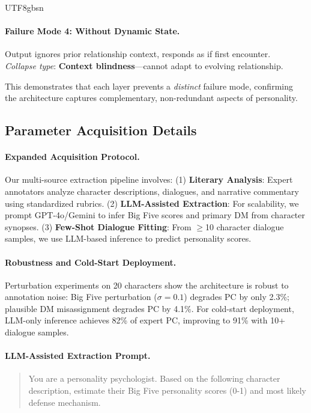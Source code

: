 \documentclass[11pt]{article}
\begin{document}
\begin{CJK*}{UTF8}{gbsn}
\paragraph{Failure Mode 4: Without Dynamic State.}
Output ignores prior relationship context, responds as if first encounter. \\
\textit{Collapse type}: \textbf{Context blindness}---cannot adapt to evolving relationship.

This demonstrates that each layer prevents a \textit{distinct} failure mode, confirming the architecture captures complementary, non-redundant aspects of personality.

\subsection{Parameter Acquisition Details}
\label{sec:param_acquisition}

\paragraph{Expanded Acquisition Protocol.}
Our multi-source extraction pipeline involves:
(1) \textbf{Literary Analysis}: Expert annotators analyze character descriptions, dialogues, and narrative commentary using standardized rubrics.
(2) \textbf{LLM-Assisted Extraction}: For scalability, we prompt GPT-4o/Gemini to infer Big Five scores and primary DM from character synopses.
(3) \textbf{Few-Shot Dialogue Fitting}: From $\geq$10 character dialogue samples, we use LLM-based inference to predict personality scores.

\paragraph{Robustness and Cold-Start Deployment.}
Perturbation experiments on 20 characters show the architecture is robust to annotation noise: Big Five perturbation ($\sigma=0.1$) degrades PC by only 2.3\%; plausible DM misassignment degrades PC by 4.1\%. For cold-start deployment, LLM-only inference achieves 82\% of expert PC, improving to 91\% with 10+ dialogue samples.

\paragraph{LLM-Assisted Extraction Prompt.}
\begin{quote}
\small
You are a personality psychologist. Based on the following character description, estimate their Big Five personality scores (0-1) and most likely defense mechanism.


\end{quote}
\end{CJK*}
\end{document}
